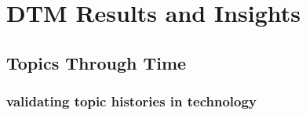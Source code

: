 
\chapter{DTM Results and Insights} %

\label{Chapter4} %



\section{Topics Through Time}

\subsection{validating topic histories in technology}




